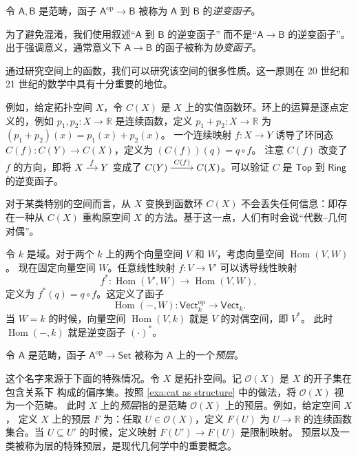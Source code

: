 \documentclass[fontset=none]{Notes}
\newenvironment{arr}[1][]{%
  $\begin{tikzcd}[cramped,#1]
}{\end{tikzcd}$}
\DeclareMathOperator\Hom{Hom}
\newcommand{\cat}[1]{\mathsf{#1}}
\newcommand{\opcat}[1]{\mathsf{#1}^{\mathrm{op}}}
\begin{document}
\begin{definition}
  令 $\cat A,\cat B$ 是范畴，函子 $\opcat A\to\cat B$ 被称为
  $\cat A$ 到 $\cat B$ 的\emph{逆变函子}。
\end{definition}

为了避免混淆，我们使用叙述“$\cat A$ 到 $\cat B$ 的逆变函子”
而不是“$\cat A\to\cat B$ 的逆变函子”。出于强调意义，通常意义下 $\cat A\to\cat B$
的函子被称为\emph{协变函子}。

\begin{example}
  通过研究空间上的函数，我们可以研究该空间的很多性质。这一原则在 20 世纪和 21 世纪的数学中具有十分重要的地位。

  例如，给定拓扑空间 $X$，令 $C(X)$ 是 $X$ 上的实值函数环。环上的运算是逐点定义的，例如 $p_1,p_2:X\to \mathbb{R}$
  是连续函数，定义 $p_1+p_2:X\to \mathbb{R}$ 为 $(p_1+p_2)(x)=p_1(x)+p_2(x)$。
  一个连续映射 $f:X\to Y$ 诱导了环同态 $C(f):C(Y)\to C(X)$，定义为 $(C(f))(q)=q\circ f$。
  注意 $C(f)$ 改变了 $f$ 的方向，即将   
  \begin{arr}[sep=small]
    X\arrow[r,"f"] & Y
  \end{arr}
  变成了 
  \begin{arr}
    C(Y)\arrow[r,"C(f)"] & C(X)
  \end{arr}。可以验证 $C$ 是 $\cat{Top}$ 到 $\cat{Ring}$ 的逆变函子。

  对于某类特别的空间而言，从 $X$ 变换到函数环 $C(X)$ 不会丢失任何信息：即存在一种从 $C(X)$
  重构原空间 $X$ 的方法。基于这一点，人们有时会说“代数--几何对偶”。
\end{example}

\begin{example}
  令 $k$ 是域。对于两个 $k$ 上的两个向量空间 $V$ 和 $W$，考虑向量空间 $\Hom(V,W)$。
  现在固定向量空间 $W$。任意线性映射 $f:V\to V'$ 可以诱导线性映射
  \[
    f^*:\Hom(V',W)\to \Hom(V,W),
  \]
  定义为 $f^*(q)=q\circ f$。这定义了函子
  \[
    \Hom(-,W):\opcat{\cat{Vect}}_k\to \cat{Vect}_k.
  \]
  当 $W=k$ 的时候，向量空间 $\Hom(V,k)$ 就是 $V$ 的对偶空间，即 $V^*$。
  此时 $\Hom(-,k)$ 就是逆变函子 $(\cdot)^*$。
\end{example}


\begin{definition}
  令 $\cat{A}$ 是范畴，函子 $\opcat A\to \cat{Set}$ 被称为 $\cat A$ 上的一个\emph{预层}。
\end{definition}

这个名字来源于下面的特殊情况。令 $X$ 是拓扑空间。记 $\mathcal O(X)$ 是 $X$ 的开子集在包含关系下
构成的偏序集。按照 \autoref{exa:cat as structure} 中的做法，将 $\mathcal O(X)$ 视为一个范畴。
此时 $X$ 上的\emph{预层}指的是范畴 $\mathcal O(X)$ 上的预层。例如，给定空间 $X$，
定义 $X$ 上的预层 $F$ 为：任取 $U\in\mathcal O(X)$，定义 $F(U)$ 为 $U\to \mathbb{R}$
的连续函数集合。当 $U\subseteq U'$ 的时候，定义映射 $F(U')\to F(U)$ 是限制映射。
预层以及一类被称为层的特殊预层，是现代几何学中的重要概念。
\end{document}
